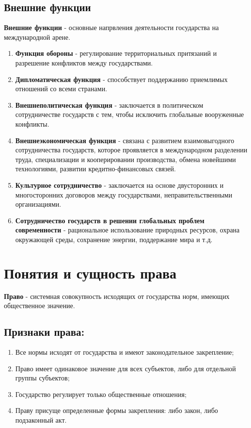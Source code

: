 \documentclass[a5paper,10pt]{article}
\begin{document}
		\subsection{Внешние функции}
			\textbf{Внешние функции} - основные напрвления деятельности государства на международной арене.
			\begin{enumerate}
				\item \textbf{Функция обороны} - регулирование территориальных притязаний и разрешение конфликтов между государствами.

				\item \textbf{Дипломатическая функция} - способствует поддержанию приемлимых отношений со всеми странами.

				\item \textbf{Внешнеполитическая функция} - заключается в политическом сотрудничестве государств с тем, чтобы исключить глобальные вооруженные конфликты.

				\item \textbf{Внешнеэкономическая функция} - связана с развитием взаимовыгодного сотрудничества государств, которое проявляется в международном разделении труда, специализации и кооперировании производства, обмена новейшими технологиями, развитии кредитно-финансовых связей.

				\item \textbf{Культурное сотрудничество} - заключается на основе двусторонних и многосторонних договоров между государствами, неправительственными организациями.

				\item \textbf{Сотрудничество государств в решении глобальных проблем современности} - рациональное использование природных ресурсов, охрана окружающей среды, сохранение энергии, поддержание мира и т.д.
			\end{enumerate}

	\section{Понятия и сущность права}
		\textbf{Право} - системная совокупность исходящих от государства норм, имеющих общественное значение.
		\subsection{Признаки права:}
			\begin{enumerate}
				\item Все нормы исходят от государства и имеют законодательное закрепление;

				\item Право имеет одинаковое значение для всех субъектов, либо для отдельной группы субъектов;

				\item Государство регулирует только общественные отношения;

				\item Праву присуще определенные формы закрепления: либо закон, либо подзаконный акт.
			\end{enumerate}
\end{document}
